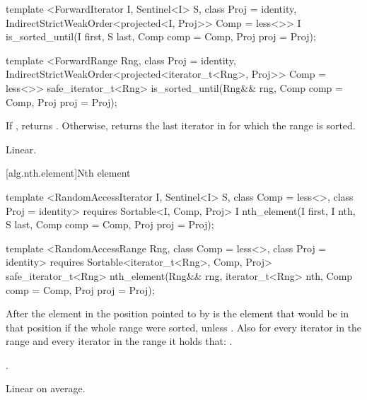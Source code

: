 \begin{itemdescr}
\pnum
\returns {}
\end{itemdescr}

%
\begin{itemdecl}
template <ForwardIterator I, Sentinel<I> S, class Proj = identity,
    IndirectStrictWeakOrder<projected<I, Proj>> Comp = less<>>
  I is_sorted_until(I first, S last, Comp comp = Comp{}, Proj proj = Proj{});

template <ForwardRange Rng, class Proj = identity,
    IndirectStrictWeakOrder<projected<iterator_t<Rng>, Proj>> Comp = less<>>
  safe_iterator_t<Rng>
    is_sorted_until(Rng&& rng, Comp comp = Comp{}, Proj proj = Proj{});
\end{itemdecl}

\begin{itemdescr}
\pnum
\returns If , returns
. Otherwise, returns
the last iterator  in  for which the
range  is sorted.

\pnum
\complexity Linear.
\end{itemdescr}

[alg.nth.element]{Nth element}

%
\begin{itemdecl}
template <RandomAccessIterator I, Sentinel<I> S, class Comp = less<>,
    class Proj = identity>
  requires Sortable<I, Comp, Proj>
  I nth_element(I first, I nth, S last, Comp comp = Comp{}, Proj proj = Proj{});

template <RandomAccessRange Rng, class Comp = less<>, class Proj = identity>
  requires Sortable<iterator_t<Rng>, Comp, Proj>
  safe_iterator_t<Rng>
    nth_element(Rng&& rng, iterator_t<Rng> nth, Comp comp = Comp{}, Proj proj = Proj{});
\end{itemdecl}

\begin{itemdescr}
\pnum
After
the element in the position pointed to by 
is the element that would be
in that position if the whole range were sorted, unless .
Also for every iterator
in the range
and every iterator
in the range
it holds that:
.

\pnum
\returns {}.

\pnum
\complexity
Linear on average.
\end{itemdescr}

